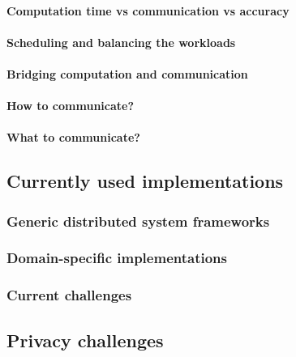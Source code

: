 \paragraph{Computation time vs communication vs accuracy}
\paragraph{Scheduling and balancing the workloads}
\paragraph{Bridging computation and communication}
\paragraph{How to communicate?}
\paragraph{What to communicate?}










\subsection{Currently used implementations}
\subsubsection{Generic distributed system frameworks}
\subsubsection{Domain-specific implementations}
\subsubsection{Current challenges}










\subsection{Privacy challenges}